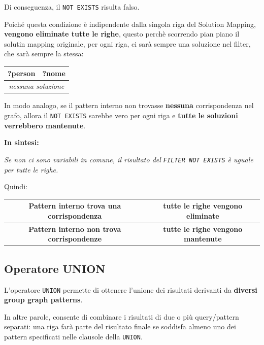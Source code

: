 Di conseguenza, il \texttt{NOT EXISTS} risulta falso.

Poiché questa condizione è indipendente dalla singola riga del
Solution Mapping, \textbf{vengono eliminate tutte le righe}, questo perchè scorrendo pian piano il solutin mapping originale, per ogni riga, ci sarà sempre una soluzione
nel filter, che sarà sempre la stessa:

\begin{table}[h!]
\centering
\begin{tabular}{|l|l|}
\hline
\textbf{?person} & \textbf{?nome} \\ \hline
\multicolumn{2}{|c|}{\textit{nessuna soluzione}} \\ \hline
\end{tabular}
\end{table}

In modo analogo, se il pattern interno non trovasse \textbf{nessuna}
corrispondenza nel grafo, allora il \texttt{NOT EXISTS} sarebbe vero
per ogni riga e \textbf{tutte le soluzioni verrebbero mantenute}.

\textbf{In sintesi:}

\begin{center}
\textit{Se non ci sono variabili in comune, il risultato del
\texttt{FILTER NOT EXISTS} è uguale per tutte le righe.}
\end{center}

Quindi:

\begin{center}
\begin{tabular}{|c|c|}
\hline
\textbf{Pattern interno trova una corrispondenza} &
\textbf{tutte le righe vengono eliminate} \\ \hline
\textbf{Pattern interno non trova corrispondenze} &
\textbf{tutte le righe vengono mantenute} \\ \hline
\end{tabular}
\end{center}


\subsection{Operatore UNION}
L'operatore \texttt{UNION} permette di ottenere l'unione dei risultati derivanti da \textbf{diversi group graph patterns}.

In altre parole, consente di combinare i risultati di due o più query/pattern separati: una riga farà parte del risultato finale se soddisfa almeno uno dei pattern specificati nelle clausole della \texttt{UNION}.

